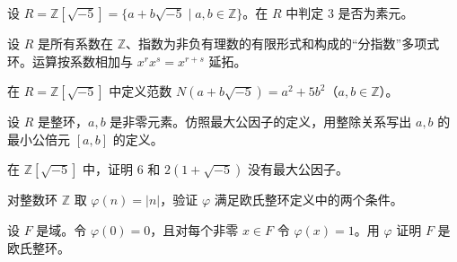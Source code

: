 \noindent\begin{minipage}{\textwidth}
设 $R=\mathbb{Z}[\sqrt{-5}]=\{a+b\sqrt{-5}\mid a,b\in\mathbb{Z}\}$。在 $R$ 中判定 $3$ 是否为素元。
\end{minipage}\par\vfill
\noindent\begin{minipage}{\textwidth}
设 $R$ 是所有系数在 $\mathbb{Z}$、指数为非负有理数的有限形式和构成的“分指数”多项式环。运算按系数相加与 $x^r x^s=x^{r+s}$ 延拓。
\end{minipage}\par\vfill
\newpage
\noindent\begin{minipage}{\textwidth}
在 $R=\mathbb{Z}[\sqrt{-5}]$ 中定义范数 $N(a+b\sqrt{-5})=a^2+5b^2$（$a,b\in\mathbb{Z}$）。
\end{minipage}\par\vfill
\noindent\begin{minipage}{\textwidth}
设 $R$ 是整环，$a,b$ 是非零元素。仿照最大公因子的定义，用整除关系写出 $a,b$ 的最小公倍元 $[a,b]$ 的定义。
\end{minipage}\par\vfill
\noindent\begin{minipage}{\textwidth}
在 $\mathbb{Z}[\sqrt{-5}]$ 中，证明 $6$ 和 $2(1+\sqrt{-5})$ 没有最大公因子。
\end{minipage}\par\vfill
\newpage
\noindent\begin{minipage}{\textwidth}
对整数环 $\mathbb{Z}$ 取 $\varphi(n)=|n|$，验证 $\varphi$ 满足欧氏整环定义中的两个条件。
\end{minipage}\par\vfill
\noindent\begin{minipage}{\textwidth}
设 $F$ 是域。令 $\varphi(0)=0$，且对每个非零 $x\in F$ 令 $\varphi(x)=1$。用 $\varphi$ 证明 $F$ 是欧氏整环。
\end{minipage}\par\vfill
